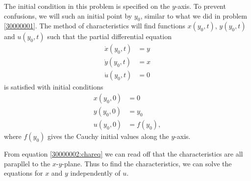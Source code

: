 \begin{loesung}
The initial condition in this problem is specified on the $y$-axis.
To prevent confusions, we will such an initial point by $y_0$, similar
to what we did in problem \ref{30000001}.
The method of characteristics will find functions $x(y_0,t)$,
$y(y_0,t)$ and $u(y_0,t)$ such that the partial differential equation
\begin{equation}
\begin{aligned}
\dot x(y_0, t)&=y\\
\dot y(y_0, t)&=x\\
\dot u(y_0, t)&=0
\end{aligned}
\label{30000002:chareq}
\end{equation}
is satisfied with initial conditions
\begin{align*}
x(y_0, 0)&=0\\
y(y_0, 0)&=y_0\\
u(y_0, 0)&=f(y_0),
\end{align*}
where $f(y_0)$ gives the Cauchy initial values along the $y$-axis.
\begin{teilaufgaben}
\item
From equation \eqref{30000002:chareq} we can read off that the characteristics
are all parapllel to the $x$-$y$-plane.
Thus to find the characteristics, we can solve the equations for $x$ and $y$
independently of $u$.


\end{teilaufgaben}
\end{loesung}
